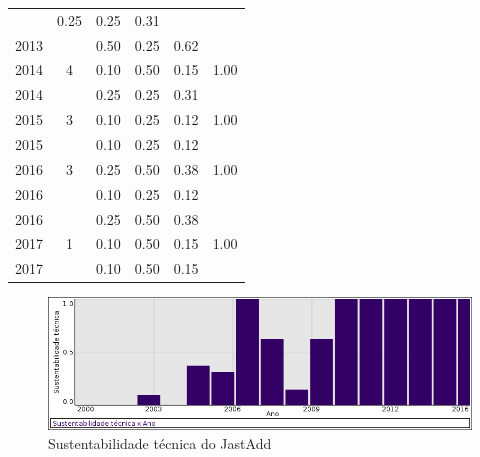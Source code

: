 \begin{table}[H]
\begin{tabular}{| l | c | c | c | c | c |}
          &
          0.25
          &
          0.25
          &
          0.31
          &
          \\
            2013
          &
          
          &
          0.50
          &
          0.25
          &
          0.62
          &
          \\
\hline
            2014
          &
          4
          &
          0.10
          &
          0.50
          &
          0.15
          &
            {\color{blue} 1.00}
          \\
            2014
          &
          
          &
          0.25
          &
          0.25
          &
          0.31
          &
          \\
\hline
            2015
          &
          3
          &
          0.10
          &
          0.25
          &
          0.12
          &
            {\color{blue} 1.00}
          \\
            2015
          &
          
          &
          0.10
          &
          0.25
          &
          0.12
          &
          \\
\hline
            2016
          &
          3
          &
          0.25
          &
          0.50
          &
          0.38
          &
            {\color{blue} 1.00}
          \\
            2016
          &
          
          &
          0.10
          &
          0.25
          &
          0.12
          &
          \\
            2016
          &
          
          &
          0.25
          &
          0.50
          &
          0.38
          &
          \\
\hline
            2017
          &
          1
          &
          0.10
          &
          0.50
          &
          0.15
          &
            {\color{blue} 1.00}
          \\
            2017
          &
          
          &
          0.10
          &
          0.50
          &
          0.15
          &
          \\
\hline
\end{tabular}
\end{table}

\begin{figure}[h]
  \center
  \includegraphics[scale=0.50]{imagens/softwares-charts/jastadd.png}
  \caption{Sustentabilidade técnica do JastAdd}
\end{figure}



